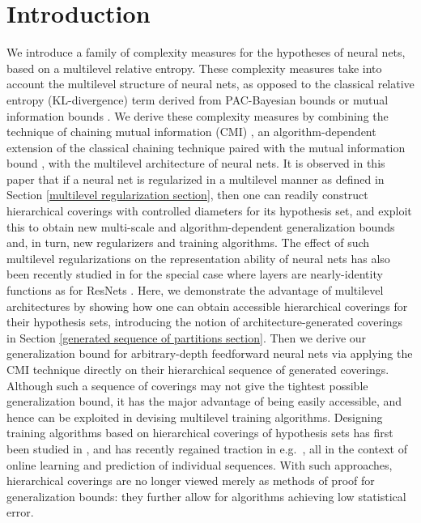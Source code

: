 \documentclass{article}
\begin{document}
\section{Introduction}
We introduce a family of complexity measures for the hypotheses of neural nets, based on a multilevel relative entropy. These complexity measures take into account the multilevel structure of neural nets, as opposed to the classical relative entropy (KL-divergence) term derived from PAC-Bayesian bounds \cite{catoni2007pac} or mutual information bounds \cite{russo2016controlling, xu2017information}. We derive these complexity measures by combining the technique of chaining mutual information (CMI) \cite{asadi2018chaining}, an algorithm-dependent extension of the classical chaining technique paired with the mutual information bound \cite{russo2016controlling}, with the multilevel architecture of neural nets. It is observed in this paper that if a neural net is regularized in a multilevel manner as defined in Section \ref{multilevel regularization section}, then one can readily construct hierarchical coverings with controlled diameters for its hypothesis set, and exploit this to obtain new multi-scale and algorithm-dependent generalization bounds and, in turn, new regularizers and training algorithms. The effect of such multilevel regularizations on the representation ability of neural nets has also been recently studied in  \cite{hardt2016identity, bartlett2018representing} for the special case where layers are nearly-identity functions as for ResNets \cite{he2016deep}. Here, we demonstrate the advantage of multilevel architectures by showing how one can obtain accessible hierarchical coverings for their hypothesis sets, introducing the notion of architecture-generated coverings in Section \ref{generated sequence of partitions section}. Then we derive our generalization bound for arbitrary-depth feedforward neural nets via applying the CMI technique directly on their hierarchical sequence of generated coverings. Although such a sequence of coverings may not give the tightest possible generalization bound, it has the major advantage of being easily accessible, and hence can be exploited in devising multilevel training algorithms. Designing training algorithms based on hierarchical coverings of hypothesis sets has first been studied in \cite{cesa1999prediction}, and has recently regained traction in e.g.\ \cite{gaillard2015chaining, cesa2017algorithmic}, all in the context of online learning and prediction of individual sequences. With such approaches, hierarchical coverings are no longer viewed merely as methods of proof for generalization bounds: they further allow for algorithms achieving low statistical error. 
\end{document}
